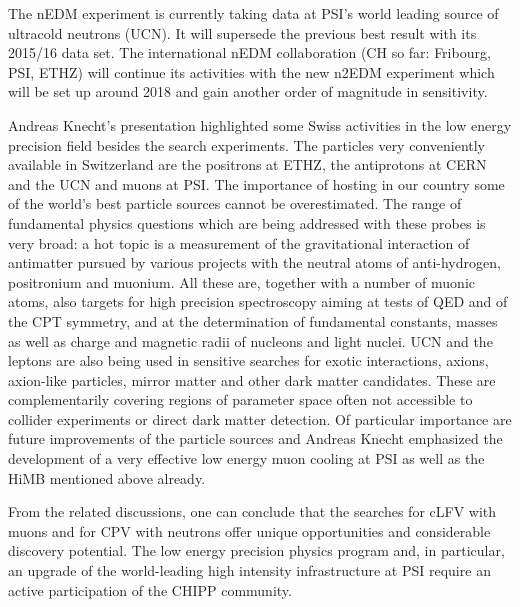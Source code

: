 \noindent  The nEDM experiment is currently taking data at PSI's world leading
source of ultracold neutrons (UCN). It will supersede the previous
best result with its 2015/16 data set. The international nEDM
collaboration (CH so far: Fribourg, PSI, ETHZ) will continue its activities with
the new n2EDM experiment which will be set up around 2018 and gain
another order of magnitude in sensitivity.

\medskip
\noindent Andreas Knecht's presentation highlighted some Swiss activities in the
low energy precision field besides the search experiments. The
particles very conveniently available in Switzerland are the positrons
at ETHZ, the antiprotons at CERN and the UCN and muons at PSI. 
The importance of hosting in our country some of the world's best particle
sources cannot be overestimated. The range of fundamental physics questions
which are being addressed with these probes is very broad: a hot topic
is a measurement of the gravitational interaction of antimatter
pursued by various projects with the neutral atoms of anti-hydrogen,
positronium and muonium. All these are, together with a number of
muonic atoms, also targets for high precision spectroscopy aiming at
tests of QED and of the CPT symmetry, and at the determination of fundamental
constants, masses as well as charge and magnetic radii of nucleons and light
nuclei. UCN and the leptons are also being used in sensitive searches
for exotic interactions, axions, axion-like particles, mirror matter
and other dark matter candidates. These are complementarily covering
regions of parameter space often not accessible to collider
experiments or direct dark matter detection. Of particular importance
are future improvements of the particle sources and Andreas Knecht
emphasized the development of a very effective low energy muon cooling
at PSI as well as the HiMB mentioned above already.
\medskip 

\noindent From the related discussions, one can conclude that the searches for
cLFV with muons and for CPV with neutrons offer unique opportunities
and considerable discovery potential. The low energy precision physics
program and, in particular, an upgrade of the world-leading high
intensity infrastructure at PSI require an active participation of the
CHIPP community.
